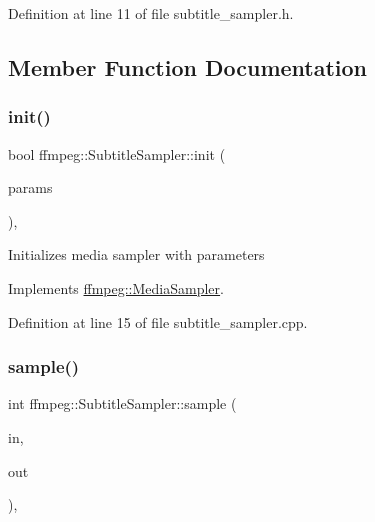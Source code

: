 Definition at line 11 of file subtitle\+\_\+sampler.\+h.



\subsection{Member Function Documentation}
\mbox{\label{classffmpeg_1_1SubtitleSampler_a352ab0faeb54596825ca1edd4406b72c}} 
\subsubsection{\texorpdfstring{init()}{init()}}
{\footnotesize\ttfamily bool ffmpeg\+::\+Subtitle\+Sampler\+::init (\begin{DoxyParamCaption}\item[{const \hyperlink{structffmpeg_1_1SamplerParameters}{Sampler\+Parameters} \&}]{params }\end{DoxyParamCaption})\hspace{0.3cm}{\ttfamily [override]}, {\ttfamily [virtual]}}

Initializes media sampler with parameters 

Implements \hyperlink{classffmpeg_1_1MediaSampler_a049962d62fc930c67d6cf5aa89ae1948}{ffmpeg\+::\+Media\+Sampler}.



Definition at line 15 of file subtitle\+\_\+sampler.\+cpp.

\mbox{\label{classffmpeg_1_1SubtitleSampler_ae4d48345d38512ece2999964731264dc}} 
\subsubsection{\texorpdfstring{sample()}{sample()}}
{\footnotesize\ttfamily int ffmpeg\+::\+Subtitle\+Sampler\+::sample (\begin{DoxyParamCaption}\item[{const \hyperlink{classffmpeg_1_1ByteStorage}{Byte\+Storage} $\ast$}]{in,  }\item[{\hyperlink{classffmpeg_1_1ByteStorage}{Byte\+Storage} $\ast$}]{out }\end{DoxyParamCaption})\hspace{0.3cm}{\ttfamily [override]}, {\ttfamily [virtual]}}

